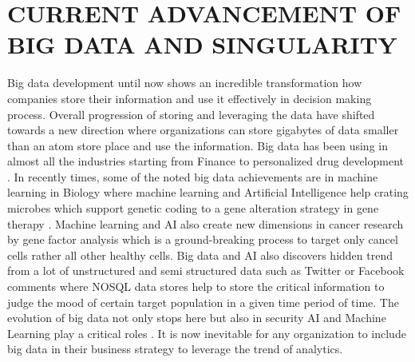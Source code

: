 \documentclass[sigconf]{acmart}
\begin{document}
\section{CURRENT ADVANCEMENT OF BIG DATA AND  SINGULARITY }
Big data development until now shows an incredible transformation how companies store their information and use it effectively in decision making process. Overall progression of storing and leveraging the data have shifted towards a new direction where organizations can store gigabytes of data smaller than an atom store place and use the information. Big data has been using in almost all the industries starting from Finance to personalized drug development \cite{editor07}. In recently times, some of the noted big data achievements are in machine learning in Biology where machine learning and Artificial Intelligence help crating microbes which support genetic coding to a gene alteration strategy in gene therapy \cite{editor02}. Machine learning and AI also create new dimensions in cancer research by gene factor analysis which is a ground-breaking process to target only cancel cells rather all other healthy cells. Big data and AI also discovers hidden trend from a lot of unstructured and semi structured data such as Twitter or Facebook comments where NOSQL data stores help to store the critical information to judge the mood of certain target population in a given time period of time. The evolution of big data not only stops here but also in security AI and Machine Learning play a critical roles \cite{editor02}. It is now inevitable for any organization to include big data in their business strategy to leverage the trend of analytics.
\end{document}

